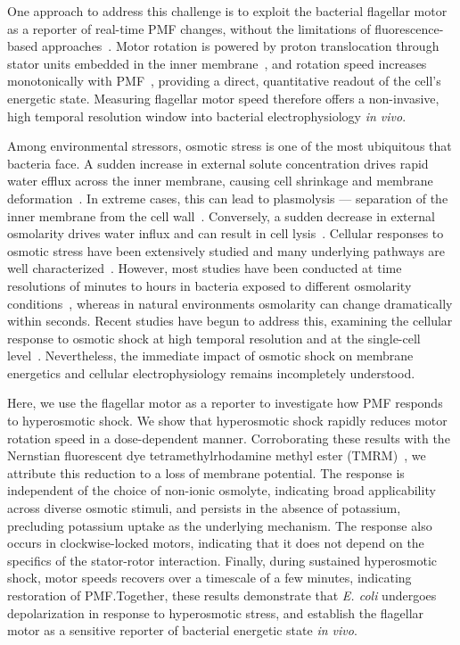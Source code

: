 \documentclass[twocolumn]{biophys-new}%
\begin{document}
One approach to address this challenge is to exploit the bacterial flagellar motor as a reporter of real-time PMF changes, without the limitations of fluorescence-based approaches~\cite{walter2007light,KRASNOPEEVA2019l,biquet2021dynamicl}. Motor rotation is powered by proton translocation through stator units embedded in the inner membrane~\cite{wadhwa2022bacterial}, and rotation speed increases monotonically with PMF~\cite{GABEL2003l,Krasnopeeva2024}, providing a direct, quantitative readout of the cell's energetic state. Measuring flagellar motor speed therefore offers a non-invasive, high temporal resolution window into bacterial electrophysiology \textit{in vivo}.

Among environmental stressors, osmotic stress is one of the most ubiquitous that bacteria face. A sudden increase in external solute concentration drives rapid water efflux across the inner membrane, causing cell shrinkage and membrane deformation~\cite{pilizota2013plasmolysis,Fuchino2017}. In extreme cases, this can lead to plasmolysis --- separation of the inner membrane from the cell wall~\cite{eugene1963}. Conversely, a sudden decrease in external osmolarity drives water influx and can result in cell lysis~\cite{WongAmir2019}. Cellular responses to osmotic stress have been extensively studied and many underlying pathways are well characterized~\cite{sleator_hill,Altendorf2009}. However, most studies have been conducted at time resolutions of minutes to hours in bacteria exposed to different osmolarity conditions~\cite{wood2010,wood2015}, whereas in natural environments osmolarity can change dramatically within seconds. Recent studies have begun to address this, examining the cellular response to osmotic shock at high temporal resolution and at the single-cell level~\cite{pilizota2013plasmolysis,rosko-2017,Rojas2020,sun2021}. Nevertheless, the immediate impact of osmotic shock on membrane energetics and cellular electrophysiology remains incompletely understood.

Here, we use the flagellar motor as a reporter to investigate how PMF responds to hyperosmotic shock. We show that hyperosmotic shock rapidly reduces motor rotation speed in a dose-dependent manner. Corroborating these results with the Nernstian fluorescent dye tetramethylrhodamine methyl ester (TMRM)~\cite{LO2007etl,MANCINI20204l}, we attribute this reduction to a loss of membrane potential. The response is independent of the choice of non-ionic osmolyte, indicating broad applicability across diverse osmotic stimuli, and persists in the absence of potassium, precluding potassium uptake as the underlying mechanism. The response also occurs in clockwise-locked motors, indicating that it does not depend on the specifics of the stator-rotor interaction. Finally, during sustained hyperosmotic shock, motor speeds recovers over a timescale of a few minutes, indicating restoration of PMF.Together, these results demonstrate that \textit{E. coli} undergoes depolarization in response to hyperosmotic stress, and establish the flagellar motor as a sensitive reporter of bacterial energetic state \textit{in vivo}.
\end{document}
